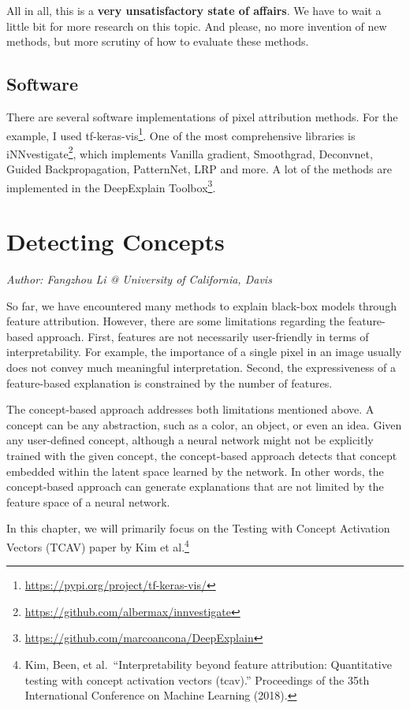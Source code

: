 \documentclass[
  12pt,
]{krantz}
\renewcommand{\href}[2]{#2\footnote{\url{#1}}}
\begin{document}
All in all, this is a \textbf{very unsatisfactory state of affairs}.
We have to wait a little bit for more research on this topic.
And please, no more invention of new methods, but more scrutiny of how to evaluate these methods.

\hypertarget{software-5}{%
\subsection{Software}\label{software-5}}

There are several software implementations of pixel attribution methods.
For the example, I used \href{https://pypi.org/project/tf-keras-vis/}{tf-keras-vis}.
One of the most comprehensive libraries is \href{https://github.com/albermax/innvestigate}{iNNvestigate}, which implements Vanilla gradient, Smoothgrad, Deconvnet, Guided Backpropagation, PatternNet, LRP and more.
A lot of the methods are implemented in the \href{https://github.com/marcoancona/DeepExplain}{DeepExplain Toolbox}.

\newpage

\hypertarget{detecting-concepts}{%
\section{Detecting Concepts}\label{detecting-concepts}}

\emph{Author: Fangzhou Li @ University of California, Davis}

So far, we have encountered many methods to explain black-box models through feature attribution.
However, there are some limitations regarding the feature-based approach.
First, features are not necessarily user-friendly in terms of interpretability.
For example, the importance of a single pixel in an image usually does not convey much meaningful interpretation.
Second, the expressiveness of a feature-based explanation is constrained by the number of features.

The concept-based approach addresses both limitations mentioned above.
A concept can be any abstraction, such as a color, an object, or even an idea.
Given any user-defined concept, although a neural network might not be explicitly trained with the given concept, the concept-based approach detects that concept embedded within the latent space learned by the network.
In other words, the concept-based approach can generate explanations that are not limited by the feature space of a neural network.

In this chapter, we will primarily focus on the Testing with Concept Activation Vectors (TCAV) paper by Kim et al.\footnote{Kim, Been, et al.~``Interpretability beyond feature attribution: Quantitative testing with concept activation vectors (tcav).'' Proceedings of the 35th International Conference on Machine Learning (2018).}
\end{document}
